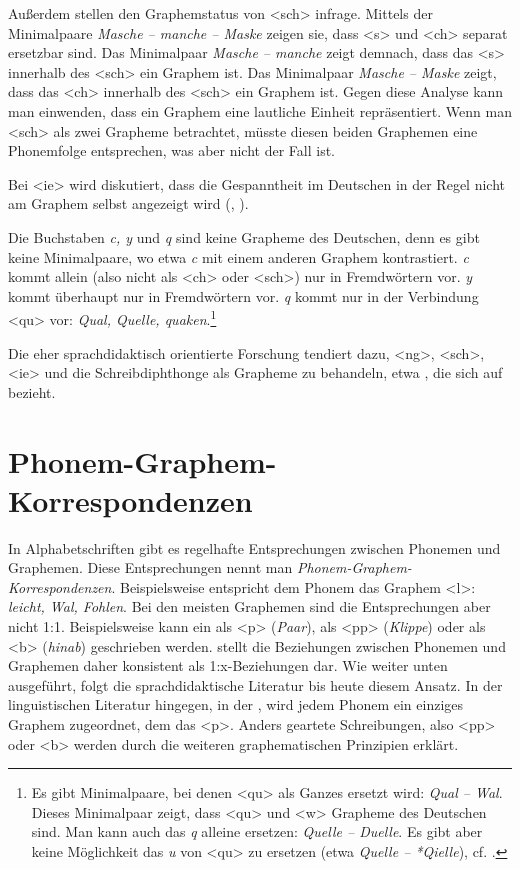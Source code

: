 Außerdem stellen \citet[205]{FuhrhopPeters2013} den Graphemstatus von <sch> infrage. Mittels der Minimalpaare \textit{Masche -- manche -- Maske}  zeigen sie, dass <s> und <ch> separat ersetzbar sind. Das Minimalpaar \textit{Masche -- manche} zeigt demnach, dass das <s> innerhalb des <sch> ein Graphem ist. Das Minimalpaar \textit{Masche -- Maske} zeigt, dass das <ch> innerhalb des <sch> ein Graphem ist. Gegen diese Analyse kann man einwenden, dass ein Graphem eine lautliche Einheit repräsentiert. Wenn man <sch> als zwei Grapheme betrachtet, müsste diesen beiden Graphemen eine Phonemfolge entsprechen, was aber nicht der Fall ist.

Bei <ie> wird diskutiert, dass die Gespanntheit im Deutschen in der Regel nicht am Graphem selbst angezeigt wird (\cite[211]{FuhrhopPeters2013}, \cite[24]{Primus2010}). 

Die Buchstaben \textit{c, y} und \textit{q} sind keine Grapheme des Deutschen, denn es gibt keine Minimalpaare, wo etwa \textit{c} mit einem anderen Graphem kontrastiert. \textit{c} kommt allein (also nicht als <ch> oder <sch>) nur in Fremdwörtern vor. \textit{y} kommt überhaupt nur in Fremdwörtern vor. \textit{q} kommt nur in der Verbindung <qu> vor: \textit{Qual, Quelle, quaken}.\footnote{Es gibt Minimalpaare, bei denen <qu> als Ganzes ersetzt wird: \textit{Qual -- Wal}. Dieses Minimalpaar zeigt, dass <qu> und <w> Grapheme des Deutschen sind. Man kann auch das \textit{q} alleine ersetzen: \textit{Quelle -- Duelle}.  Es gibt aber keine Möglichkeit das \textit{u} von <qu> zu ersetzen (etwa \textit{Quelle -- *Qielle}), cf. \citet[204]{FuhrhopPeters2013}.}

Die eher sprachdidaktisch orientierte Forschung tendiert dazu, <ng>, <sch>, <ie> und die Schreibdiph\-thonge als Grapheme zu behandeln, etwa \citet[21--22]{SchruenderLenzen2013}, die sich auf \citet{Thome2000a} bezieht.


\section{Phonem-Graphem-Korrespondenzen}\label{sec:PGK}

In Alphabetschriften gibt es regelhafte Entsprechungen zwischen Phonemen und Graphemen. Diese Entsprechungen nennt man \textit{Phonem-Graphem-Korres\-pon\-den\-zen}. Beispielsweise entspricht dem  Phonem  das Graphem <l>: \textit{leicht, Wal, Fohlen}. Bei den meisten Graphemen sind die Entsprechungen aber nicht 1:1. Beispielsweise kann ein  als <p> (\textit{Paar}), als <pp> (\textit{Klippe}) oder als <b> (\textit{hinab}) geschrieben werden. \citet[95--97]{Nerius1989} stellt die Beziehungen zwischen Phonemen und Graphemen daher konsistent als 1:x-Beziehungen dar. Wie weiter unten ausgeführt, folgt die sprachdidaktische Literatur bis heute diesem Ansatz. In der linguistischen Literatur hingegen, \zB in der \citet[910]{Duden2022}, wird jedem Phonem ein einziges Graphem zugeordnet, \zB dem  das <p>. Anders geartete Schreibungen, also <pp> oder <b> werden durch die weiteren graphematischen Prinzipien erklärt.

